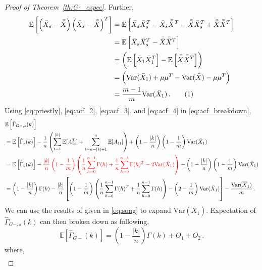 \documentclass[11pt]{article}
\newcommand{\E}{\mathbb{E}}
\newcommand{\Var}{\text{Var}}
\newcommand\numberthis{\addtocounter{equation}{1}\tag{\theequation}}
\theoremstyle{remark}
\begin{document}
\begin{proof}[Proof of Theorem~\ref{th:G-_expec}]
Further,
\begin{align*}
\mathbb{E}\left[ \left(\bar{X}_{s} - \bar{\bar{X}} \right)  \left(\bar{X}_{s} - \bar{\bar{X}} \right)^{T}\right] &= \mathbb{E}\left[ \bar{X}_{s}\bar{X}_{s}^{T} - \bar{X}_{s}\bar{\bar{X}}^{T} - \bar{\bar{X}} \bar{X}_{s}^{T} + \bar{\bar{X}}\bar{\bar{X}}^{T}\right]\\
&= \mathbb{E}\left[ \bar{X}_{s}\bar{X}_{s}^{T} - \bar{\bar{X}}\bar{\bar{X}}^{T}\right]\\
&= \left(\mathbb{E}\left[\bar{X}_{1}\bar{X}_{1}^{T}\right] - \mathbb{E}\left[\bar{\bar{X}}\bar{\bar{X}}^{T}\right]\right)\\
&= \left(\Var(\bar{X}_{1}) + \mu\mu^{T} - \Var(\bar{\bar{X}}) - \mu\mu^{T}\right)\\
&= \dfrac{m-1}{m}\Var(\bar{X}_1)\,. \numberthis \label{eq:acf_4}
\end{align*}
%
Using \eqref{eq:priestly}, \eqref{eq:acf_2}, \eqref{eq:acf_3}, and \eqref{eq:acf_4} in \eqref{eq:acf_breakdown},
\begin{align*}
    & \E \left[\hat{\Gamma}_{G-,s}(k) \right] \\
    &= \mathbb{E}\left[\hat{\Gamma}_{s}(k)\right] - \dfrac{1}{n} \left(\sum\limits_{t=1}^{|k|}\mathbb{E}[A_{1t}^T] + \sum\limits_{t=n-|k|+1}^{n}\mathbb{E}[A_{1t}]\right) + \left(1- \dfrac{|k|}{n}\right)\left(1-\dfrac{1}{m}\right)\Var(\bar{X}_1)\\
    &= \mathbb{E}\left[\hat{\Gamma}_{s}(k)\right] - {\color{red}\dfrac{|k|}{n}\left(1-\dfrac{1}{m}\right)\left(\dfrac{1}{n}\sum_{h=0}^{n-1}\Gamma(h) + \dfrac{1}{n}\sum_{h=0}^{n-1}\Gamma(h)^T - 2 \Var(\bar{X}_1)\right)} + \left(1- \dfrac{|k|}{n}\right)\left(1-\dfrac{1}{m}\right)\Var(\bar{X}_1)\\
    &= \left(1- \dfrac{|k|}{n}\right)\Gamma(k) - \dfrac{|k|}{n}\left[\left(1-\dfrac{1}{m}\right)\left(\dfrac{1}{n}\sum_{h=0}^{n-1}\Gamma(h)^T + \dfrac{1}{n}\sum_{h=0}^{n-1}\Gamma(h)\right) - \left(2-\dfrac{1}{m}\right) \Var(\bar{X}_1)\right] - \dfrac{\Var(\overline{X}_1)}{m}\,.
\end{align*}
%
 We can use the results of \cite{song1995optimal} given in \eqref{eq:song} to expand $\Var(\bar{X}_1)$. Expectation of $\hat{\Gamma}_{G-,s}(k)$ can then broken down as following,
 \begin{equation} \label{eq:G-_expec_breakdown}
     \mathbb{E}\left[\hat{\Gamma}_{G-}(k)\right] = \left(1- \dfrac{|k|}{n}\right)\Gamma(k) + O_1 + O_2\,.
 \end{equation}
%
where,
\begin{align*}

\end{align*}
\end{proof}
\end{document}
